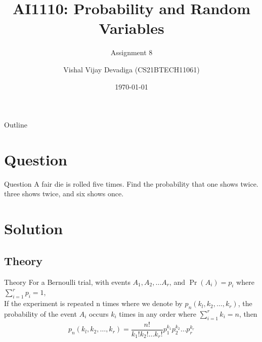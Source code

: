 \documentclass{beamer}
\title{AI1110: Probability and Random Variables}
\subtitle{Assignment 8}
\author{Vishal Vijay Devadiga (CS21BTECH11061)}
\date{\today}
\providecommand{\pr}[1]{\ensuremath{\Pr\left(#1\right)}}
\providecommand{\brak}[1]{\ensuremath{\left(#1\right)}}
\begin{document}
\begin{frame}
    \titlepage
\end{frame}

\logo{}

\begin{frame}{Outline}
    \tableofcontents
\end{frame}

\section{Question}
\begin{frame}{Question}
    A fair die is rolled five times. Find the probability that one shows twice. three shows twice, and six shows once.
\end{frame}

\section{Solution}
\subsection{Theory}
\begin{frame}{Theory}
        For a Bernoulli trial, with events $A_1,A_2, \dots A_r$, and $\pr{A_i} = p_i$ where $\sum^r_{i=1} p_i = 1$, \\ 
        If the experiment is repeated n times where we denote by $p_n\brak{k_l,k_2,\dots,k_r}$, the probability of
        the event $A_i$ occurs $k_i$ times in any order where $\sum^r_{i=1} k_i = n$, then
        \begin{align}
            \label{eq:theory}
            p_n\brak{k_l,k_2,\dots,k_r} = \dfrac{n!}{k_1! k_2! \dots k_r!} p_1^{k_1} p_2^{k_2} \dots p_r^{k_r}
        \end{align}
\end{frame}
\end{document}
